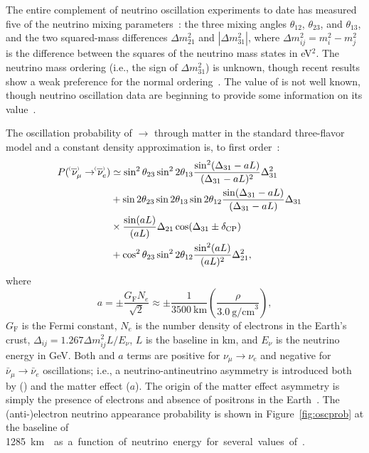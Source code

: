 The entire complement of neutrino oscillation experiments to date has measured five of the neutrino mixing parameters~\cite{Esteban:2018azc,deSalas:2017kay,Capozzi:2017yic}: the three mixing angles $\theta_{12}$, $\theta_{23}$, and $\theta_{13}$, and the two squared-mass differences $\Delta m^{2}_{21}$ and $|\Delta m^{2}_{31}|$, where $\Delta m^2_{ij} = m^2_{i} - m^{2}_{j}$ is the difference between the squares of the neutrino mass states in eV$^{2}$.
The neutrino mass ordering (i.e., the sign of $\Delta m^{2}_{31}$) is unknown, though recent results show a weak preference for the normal ordering~\cite{Abe:2018wpn,PhysRevD.97.072001,PhysRevLett.123.151803}.
The value of \deltacp is not well known, though neutrino oscillation data are beginning to provide some information on its value~\cite{Abe:2018wpn,Abe:2019vii}.

The oscillation probability of \numu $\rightarrow$ \nue through matter in the standard three-flavor model and a constant density approximation is, to first order~\cite{Nunokawa:2007qh}:
\begin{equation}
  \begin{aligned}
    P(\;\nu^{\bracketbar}_\mu \rightarrow \nu^{\bracketbar}_e) & \simeq \sin^2 \theta_{23} \sin^2 2 \theta_{13} 
    \frac{ \sin^2(\Delta_{31} - aL)}{(\Delta_{31}-aL)^2} \Delta_{31}^2 \\
    & + \sin 2 \theta_{23} \sin 2 \theta_{13} \sin 2 \theta_{12}\frac{ \sin(\Delta_{31} - aL)}{(\Delta_{31}-aL)} \Delta_{31} \\
    &\times \frac{\sin(aL)}{(aL)} \Delta_{21} \cos (\Delta_{31} \pm \mdeltacp) & \\
    & + \cos^2 \theta_{23} \sin^2 2 \theta_{12} \frac {\sin^2(aL)}{(aL)^2} \Delta_{21}^2,
  \end{aligned}
  \label{eqn:appprob}
\end{equation}
where
\begin{equation*}
  a = \pm \frac{G_{\mathrm{F}}N_e}{\sqrt{2}} \approx \pm\frac{1}{3500~\mathrm{km}}\left(\frac{\rho}{3.0~\mathrm{g/cm}^{3}}\right),
\end{equation*}
$G_{\mathrm{F}}$ is the Fermi constant, $N_e$ is the number density of electrons in the Earth's crust, $\Delta_{ij} = 1.267 \Delta m^2_{ij} L/E_\nu$, $L$ is the baseline in km, and $E_\nu$ is the neutrino energy in GeV. 
Both \deltacp and $a$ terms are positive for
$\nu_\mu \to \nu_e$ and negative for $\bar{\nu}_\mu \to \bar{\nu}_e$ oscillations; i.e.,
a neutrino-antineutrino asymmetry is introduced both by  (\deltacp)
and the matter effect ($a$). The origin of the matter effect asymmetry 
is simply the presence of electrons and absence of positrons in the Earth~\cite{Wolfenstein:1977ue,Mikheev:1986gs}.
The (anti-)electron neutrino appearance probability
is shown in 
Figure~\ref{fig:oscprob} at the  baseline of \SI{1285}\km{} as a function of neutrino 
energy for several values of \deltacp.

